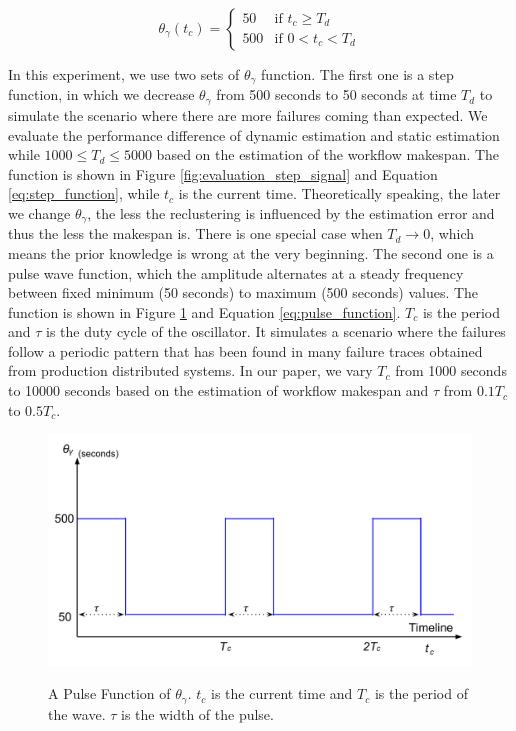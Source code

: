 \documentclass{IOS-Book-Article}
\begin{document}
\begin{equation}
\label{eq:step_function}
 \theta_{\gamma}(t_c) =
  \begin{cases}
   50 & \text{if } t_c \geq T_d \\
   500       & \text{if } 0< t_c < T_d
  \end{cases}
\end{equation}

In this experiment, we use two sets of $\theta_{\gamma}$ function. The first one is a step function, in which we decrease $\theta_{\gamma}$ from 500 seconds to 50 seconds at time $T_d$ to simulate the scenario where there are more failures coming than expected. We evaluate the performance difference of dynamic estimation and static estimation while $1000\leq T_d\leq 5000$ based on the estimation of the workflow makespan. The function is shown  in Figure \ref{fig:evaluation_step_signal} and Equation \ref{eq:step_function}, while $t_c$ is the current time. Theoretically speaking, the later we change $\theta_{\gamma}$, the less the reclustering is influenced by the estimation error and thus the less the makespan is. There is one special case when $T_d\to 0$, which means the prior knowledge is wrong at the very beginning. The second one is a pulse wave function, which the amplitude alternates at a steady frequency between fixed minimum (50 seconds) to maximum (500 seconds) values. The function is shown in Figure \ref{fig:evaluation_pulse_signal} and Equation \ref{eq:pulse_function}. $T_c$ is the period and $\tau$ is the duty cycle of the oscillator. It simulates a scenario where the failures follow a periodic pattern \cite{yigitbasi2010analysis} that has been found in many failure traces obtained from production distributed systems. In our paper, we vary $T_c$ from 1000 seconds to 10000 seconds based on the estimation of workflow makespan and $\tau$ from $0.1T_c$ to $0.5T_c$. 


\begin{figure}[htb]
	\centering
	\includegraphics[width=0.8\linewidth]{pulse_signal.pdf} \\
	\caption{A Pulse Function of $\theta_{\gamma}$. $t_c$ is the current time and $T_c$ is the period of the wave. $\tau$ is the width of the pulse. }
	\label{fig:evaluation_pulse_signal}
\end{figure}
\end{document}
